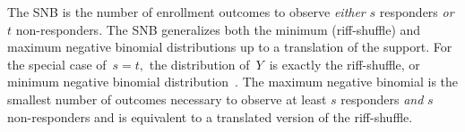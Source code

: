 \documentclass[review]{elsarticle}
\begin{document}
The SNB is the 
number of enrollment outcomes to observe {\em either} $s$ responders {\em or} 
$t$ non-responders.
The SNB generalizes both the minimum (riff-shuffle) and maximum negative
binomial distributions up to a translation of the support.
For the special case of $\,s=t,$ the distribution of $\,Y\,$ is exactly the
riff-shuffle, or minimum negative binomial distribution~\citep{Uppuluri1970}.
The maximum negative binomial \cite{Zhang2000,Zelterman2005} is the smallest 
number of outcomes necessary to 
observe at least $s$ responders {\em and} $s$ non-responders and is equivalent
to a translated version of the riff-shuffle. 

\end{document}
